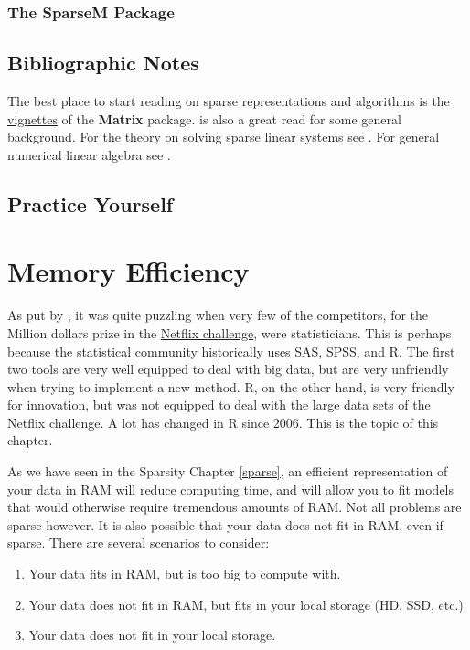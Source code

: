 \documentclass[]{book}
\providecommand{\tightlist}{%
  \setlength{\itemsep}{0pt}\setlength{\parskip}{0pt}}
\theoremstyle{definition}
\theoremstyle{definition}
\theoremstyle{definition}
\theoremstyle{remark}
\begin{document}
\subsection{The SparseM Package}\label{the-sparsem-package}

\section{Bibliographic Notes}\label{bibliographic-notes-11}

The best place to start reading on sparse representations and algorithms
is the
\href{https://cran.r-project.org/web/packages/Matrix/vignettes/Intro2Matrix.pdf}{vignettes}
of the \textbf{Matrix} package. \citet{gilbert1992sparse} is also a
great read for some general background. For the theory on solving sparse
linear systems see \citet{davis2006direct}. For general numerical linear
algebra see \citet{gentle2012numerical}.

\section{Practice Yourself}\label{practice-yourself-10}

\chapter{Memory Efficiency}\label{memory}

As put by \citet{kane2013scalable}, it was quite puzzling when very few
of the competitors, for the Million dollars prize in the
\href{https://en.wikipedia.org/wiki/Netflix_Prize}{Netflix challenge},
were statisticians. This is perhaps because the statistical community
historically uses SAS, SPSS, and R. The first two tools are very well
equipped to deal with big data, but are very unfriendly when trying to
implement a new method. R, on the other hand, is very friendly for
innovation, but was not equipped to deal with the large data sets of the
Netflix challenge. A lot has changed in R since 2006. This is the topic
of this chapter.

As we have seen in the Sparsity Chapter \ref{sparse}, an efficient
representation of your data in RAM will reduce computing time, and will
allow you to fit models that would otherwise require tremendous amounts
of RAM. Not all problems are sparse however. It is also possible that
your data does not fit in RAM, even if sparse. There are several
scenarios to consider:

\begin{enumerate}
\def\labelenumi{\arabic{enumi}.}
\tightlist
\item
  Your data fits in RAM, but is too big to compute with.
\item
  Your data does not fit in RAM, but fits in your local storage (HD,
  SSD, etc.)
\item
  Your data does not fit in your local storage.
\end{enumerate}
\end{document}
